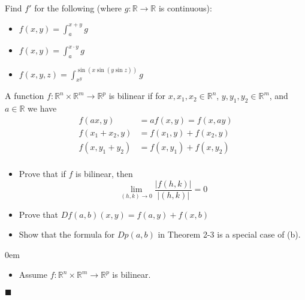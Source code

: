 \documentclass[12pt]{article}
\renewcommand{\qed}{\hfill$\blacksquare$}
\renewenvironment{proof}{\begin{addmargin}[1em]{0em}\begin{newproof}}{\end{newproof}\end{addmargin}\qed}
\newenvironment{problem}[2][Problem]{\begin{trivlist}
\item[\hskip \labelsep {\bfseries #1}\hskip \labelsep {\bfseries #2.}]}{\end{trivlist}}
\begin{document}
\begin{problem}{2.11}
Find $f'$ for the following (where $g:\mathbb{R}\rightarrow \mathbb{R}$ is continuous):
\begin{itemize}
	\item $f\left(x,y\right) = \int_a^{x+y} g$ 
	\item $f\left(x,y\right) = \int_a^{x\cdot y} g$
	\item $f\left(x,y,z\right) = \int_{x^y}^{\sin \left(x \sin \left(y \sin z\right)\right)} g $
\end{itemize}
\end{problem}






\begin{problem}{2.12}
A function $f: \mathbb{R}^n \times \mathbb{R}^m \rightarrow \mathbb{R}^p$ is bilinear if for $x,x_1,x_2 \in \mathbb{R}^n$, $y,y_1,y_2 \in \mathbb{R}^m$, and $a\in \mathbb{R}$ we have
\begin{equation*}
\begin{split}
f\left(ax,y\right) & = af\left(x,y\right) = f\left(x,ay\right) \\
f\left(x_1+x_2,y\right) & = f\left(x_1,y\right) + f\left(x_2,y\right) \\
f\left(x,y_1+y_2\right) & = f\left(x,y_1\right) + f\left(x,y_2\right) \\
\end{split}
\end{equation*}
\begin{itemize}
	\item Prove that if $f$ is bilinear, then
	$$ \lim_{\left(h,k\right)\rightarrow 0} \frac{\left|f\left(h,k\right)\right|}{\left| \left(h,k\right)\right|} = 0$$
	\item Prove that $Df\left(a,b\right)\left(x,y\right) = f\left(a,y\right) + f\left(x,b\right) $ 
	\item Show that the formula for $Dp\left(a,b\right)$ in Theorem 2-3 is a special case of (b).\\
\end{itemize}
\end{problem}


\begin{proof}
\begin{itemize}
	\item Assume $f:\mathbb{R}^n \times \mathbb{R}^m \rightarrow \mathbb{R}^p$ is bilinear. 
\end{itemize}
\end{proof}
\end{document}
